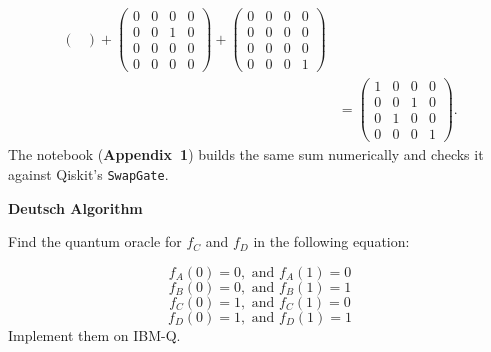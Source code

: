 \documentclass[a4paper, 10pt]{article}
\begin{document}
\begin{solution}
\begin{align*}
\begin{pmatrix}
		  \end{pmatrix}
		+ \begin{pmatrix}
			  0 & 0 & 0 & 0 \\
			  0 & 0 & 1 & 0 \\
			  0 & 0 & 0 & 0 \\
			  0 & 0 & 0 & 0
		  \end{pmatrix}
		+ \begin{pmatrix}
			  0 & 0 & 0 & 0 \\
			  0 & 0 & 0 & 0 \\
			  0 & 0 & 0 & 0 \\
			  0 & 0 & 0 & 1
		  \end{pmatrix}                                                                                                  \\
		              & = \begin{pmatrix}
			                  1 & 0 & 0 & 0 \\
			                  0 & 0 & 1 & 0 \\
			                  0 & 1 & 0 & 0 \\
			                  0 & 0 & 0 & 1
		                  \end{pmatrix}.
	\end{align*}
	The notebook (\textbf{Appendix~1}) builds the same sum numerically and checks it against Qiskit's \texttt{SwapGate}.
\end{solution}

\begin{problem}
\textbf{Deutsch Algorithm}
\par Find the quantum oracle for \( f_C \) and \( f_D \) in the following equation:

\[
	f_A(0) = 0, \text{ and } f_A(1) = 0
\]
\[
	f_B(0) = 0, \text{ and } f_B(1) = 1
\]
\[
	f_C(0) = 1, \text{ and } f_C(1) = 0
\]
\[
	f_D(0) = 1, \text{ and } f_D(1) = 1
\]
Implement them on IBM-Q.
\end{problem}
\end{document}
